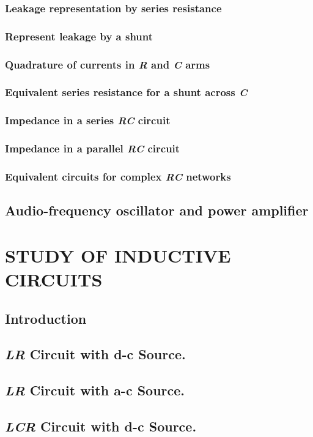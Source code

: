 \documentclass[12pt]{book}
\begin{document}
\subsection{Leakage representation by series resistance}
\subsection{Represent leakage by a shunt}
\subsection{Quadrature of currents in \textit{R} and \textit{C} arms}
\subsection{Equivalent series resistance for a shunt across \textit{C}}
\subsection{Impedance in a series \textit{RC} circuit}
\subsection{Impedance in a parallel \textit{RC} circuit}
\subsection{Equivalent circuits for complex \textit{RC} networks}
\section{Audio-frequency oscillator and power amplifier}

\chapter{STUDY OF INDUCTIVE CIRCUITS}
\section{Introduction}
\section{\textit{LR} Circuit with d-c Source.}
\section{\textit{LR} Circuit with a-c Source.}
\section{\textit{LCR} Circuit with d-c Source.}
\end{document}
